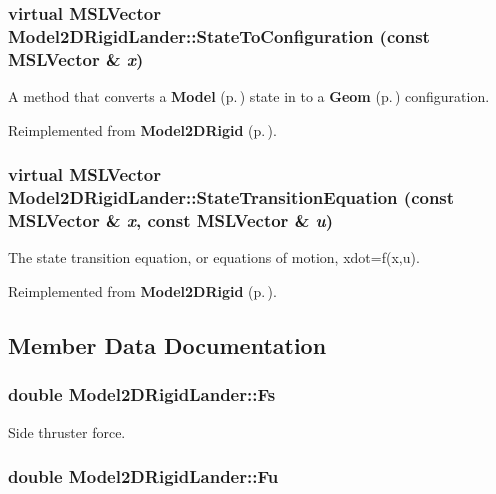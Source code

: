 \subsubsection{\setlength{\rightskip}{0pt plus 5cm}virtual {\bf MSLVector} Model2DRigid\-Lander::State\-To\-Configuration (const {\bf MSLVector} \& {\em x})\hspace{0.3cm}{\tt  [virtual]}}\label{class_Model2DRigidLander_a3}


A method that converts a {\bf Model} {\rm (p.\,\pageref{class_Model})} state in to a {\bf Geom} {\rm (p.\,\pageref{class_Geom})} configuration.



Reimplemented from {\bf Model2DRigid} {\rm (p.\,\pageref{class_Model2DRigid_a6})}.
\subsubsection{\setlength{\rightskip}{0pt plus 5cm}virtual {\bf MSLVector} Model2DRigid\-Lander::State\-Transition\-Equation (const {\bf MSLVector} \& {\em x}, const {\bf MSLVector} \& {\em u})\hspace{0.3cm}{\tt  [virtual]}}\label{class_Model2DRigidLander_a4}


The state transition equation, or equations of motion, xdot=f(x,u).



Reimplemented from {\bf Model2DRigid} {\rm (p.\,\pageref{class_Model2DRigid_a3})}.

\subsection{Member Data Documentation}
\subsubsection{\setlength{\rightskip}{0pt plus 5cm}double Model2DRigid\-Lander::Fs}\label{class_Model2DRigidLander_m2}


Side thruster force.

\subsubsection{\setlength{\rightskip}{0pt plus 5cm}double Model2DRigid\-Lander::Fu}\label{class_Model2DRigidLander_m3}


